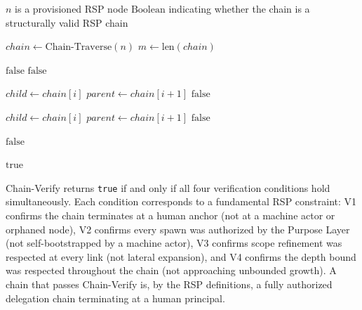 \begin{algorithm}
\caption{Chain-Verify($n$) --- Verify the authorization chain from node $n$ to human anchor}
\label{alg:chain-verify}
\begin{algorithmic}[1]
\REQUIRE $n$ is a provisioned RSP node
\ENSURE $\text{Boolean}$ indicating whether the chain is a structurally valid RSP chain

\STATE $chain \leftarrow \text{Chain-Traverse}(n)$
\STATE $m \leftarrow \text{len}(chain)$

\STATE {}
    \RETURN $\text{false}$ 
\ENDIF
{}
    \RETURN $\text{false}$ 
\ENDIF

\STATE {}
    \STATE $child \leftarrow chain[i]$
    \STATE $parent \leftarrow chain[i+1]$
        \RETURN $\text{false}$ 
    \ENDIF
\ENDFOR

\STATE {}
    \STATE $child \leftarrow chain[i]$
    \STATE $parent \leftarrow chain[i+1]$
        \RETURN $\text{false}$ 
    \ENDIF
\ENDFOR

\STATE {}
        \RETURN $\text{false}$ 
    \ENDIF
\ENDFOR

\RETURN $\text{true}$
\end{algorithmic}
\end{algorithm}

Chain-Verify returns \texttt{true} if and only if all four verification conditions hold simultaneously. Each condition corresponds to a fundamental RSP constraint: V1 confirms the chain terminates at a human anchor (not at a machine actor or orphaned node), V2 confirms every spawn was authorized by the Purpose Layer (not self-bootstrapped by a machine actor), V3 confirms scope refinement was respected at every link (not lateral expansion), and V4 confirms the depth bound was respected throughout the chain (not approaching unbounded growth). A chain that passes Chain-Verify is, by the RSP definitions, a fully authorized delegation chain terminating at a human principal.

